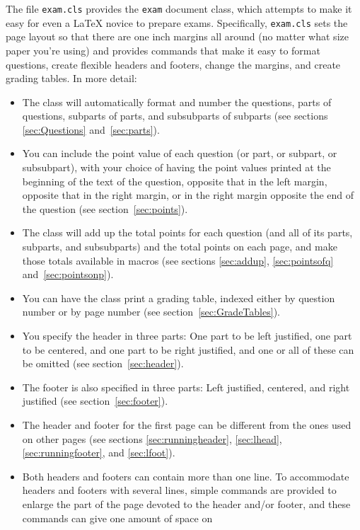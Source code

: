 \documentclass[12pt]{exam}
\begin{document}
The file \verb"exam.cls" provides the \verb"exam" document class,
which attempts to make it easy for even a \LaTeX{} novice to prepare
exams.  Specifically, \verb"exam.cls" sets the page layout so that
there are one inch margins all around (no matter what
size paper you're using) and provides commands that make it easy to
format questions, create flexible headers and footers, change the
margins, and create grading tables.  In more detail:
\begin{itemize}
\item The class will automatically format and number the questions,
  parts of questions, subparts of parts, and subsubparts of subparts
  (see sections \ref{sec:Questions} and~\ref{sec:parts}).
\item You can include the point value of each question
  (or part, or subpart, or subsubpart), with your choice of having the
  point values printed at the beginning of the text of the question,
  opposite that in the left margin, opposite that in the right margin,
  or in the right margin opposite the end of the question (see
  section~\ref{sec:points}).
\item The class will add up the total points for each question (and
  all of its parts, subparts, and subsubparts) and the total
  points on each page, and make those totals
  available in macros (see sections \ref{sec:addup},
  \ref{sec:pointsofq} and~\ref{sec:pointsonp}).
\item You can have the class print a grading table, indexed either by
  question number or by page number (see
  section~\ref{sec:GradeTables}).
\item You specify the header in three parts: One part to be left
  justified, one part to be centered, and one part to be right
  justified, and one or all of these can be omitted (see
  section~\ref{sec:header}).
\item The footer is also specified in three parts: Left justified,
  centered, and right justified (see section~\ref{sec:footer}).
\item The header and footer for the first page can be different from
  the ones used on other pages (see sections \ref{sec:runningheader},
  \ref{sec:lhead}, \ref{sec:runningfooter}, and \ref{sec:lfoot}).
\item Both headers and footers can contain more than one line.  To
  accommodate headers and footers with several lines, simple commands
  are provided to enlarge the part of the page devoted to the header
  and/or footer, and these commands can give one amount of space on

\end{itemize}
\end{document}
